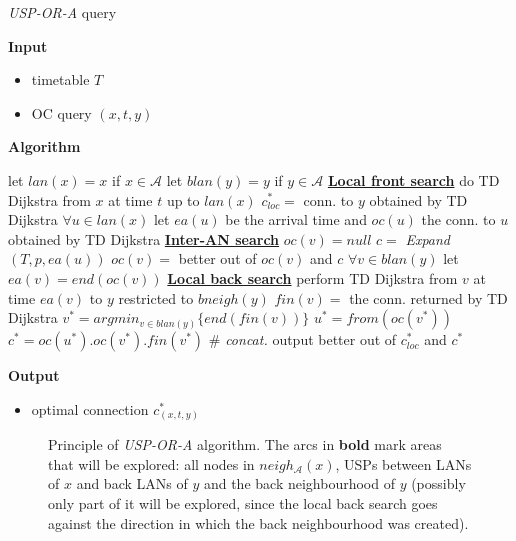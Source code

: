 \documentclass{svk_long_en}
\newcommand{\cmt}[1]{{\color{cmt-clr} \hspace*{1cm} \# \textit{#1}}}
\newcommand{\algsec}[1]{\textcolor{algsec-clr}{\textbf{\underline{#1}}}}
\newcommand{\inputTikZ}[1]{%
    \beginpgfgraphicnamed{#1-external}%
    \endpgfgraphicnamed%
}
\begin{document}
		\color{algcolor}
		\begin{algorithm}[H]
			\color{inalgcolor}
			\caption{\textit{USP-OR-A} query}
			\label{alg:uspora-query}
			\textbf{Input} 
			\begin{itemize}
				\item timetable $T$
				\item OC query $(x, t, y)$
			\end{itemize}
			\textbf{Algorithm}
			\begin{algorithmic}
				\STATE let $lan(x) = x$ if $x \in \mathcal{A}$
				\STATE let $blan(y) = y$ if $y \in \mathcal{A}$
				\STATE \algsec{Local front search}
				\STATE do TD Dijkstra from $x$ at time $t$ up to $lan(x)$
					\STATE $c_{loc}^{*} =$ conn. to $y$ obtained by TD Dijkstra
				\ENDIF
				\STATE $\forall u \in lan(x)$ let $ea(u)$ be the arrival time and $oc(u)$ the conn. to $u$ obtained by TD Dijkstra
				\STATE \algsec{Inter-AN search}
					\STATE $oc(v) = null$
							\STATE $c =$ \textit{Expand}$(T, p, ea(u))$
							\STATE $oc(v) =$ better out of $oc(v)$ and $c$
						\ENDFOR
					\ENDFOR
				\ENDFOR
				\STATE $\forall v \in blan(y)$ let $ea(v) = end(oc(v))$
				\STATE \algsec{Local back search}
					\STATE perform TD Dijkstra from $v$ at time $ea(v)$ to $y$ restricted to $bneigh(y)$
					\STATE $fin(v) =$ the conn. returned by TD Dijkstra	
				\ENDFOR
				\STATE $v^{*} = argmin_{v \in blan(y)} \{end(fin(v))\}$
				\STATE $u^{*} = from(oc(v^{*}))$
				\STATE $c^{*} = oc(u^{*}) . oc(v^{*}) . fin(v^{*})$ \cmt{concat.}
				\STATE output better out of $c_{loc}^{*}$ and $c^{*}$
			\end{algorithmic}
			\textbf{Output}
			\begin{itemize}
				\item optimal connection $c_{(x, t, y)}^{*}$
			\end{itemize}
		\end{algorithm}
		\color{black}
		
		\begin{figure}[h!]
			\begin{center}
				\scriptsize
				\inputTikZ{./tikzpics/uspora}
			\end{center}
			\caption{\label{fig:uspora} Principle of \textit{USP-OR-A} algorithm. The arcs in \textbf{bold} mark areas that will be explored: all nodes in $neigh_{\mathcal{A}}(x)$, USPs between LANs of $x$ and back LANs of $y$ and the back neighbourhood of $y$ (possibly only part of it will be explored, since the local back search goes against the direction in which the back neighbourhood was created).}
		\end{figure}
		
\end{document}
